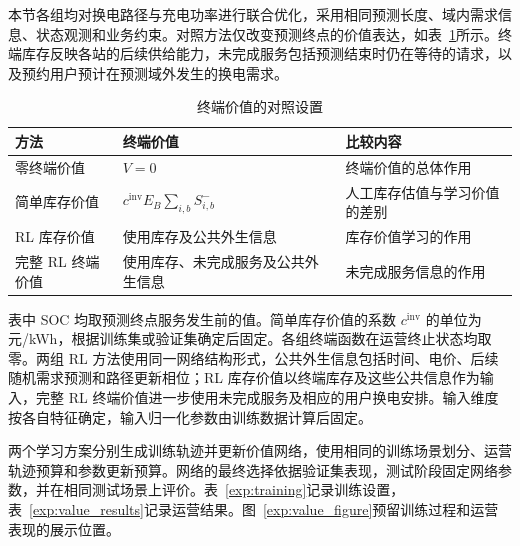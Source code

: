 \documentclass[12pt,a4paper,UTF8]{ctexart}
\numberwithin{equation}{section}
\begin{document}
本节各组均对换电路径与充电功率进行联合优化，采用相同预测长度、域内需求信息、状态观测和业务约束。对照方法仅改变预测终点的价值表达，如表~\ref{exp:value_methods}所示。终端库存反映各站的后续供给能力，未完成服务包括预测结束时仍在等待的请求，以及预约用户预计在预测域外发生的换电需求。

\begin{table}[!htbp]
  \centering
  \caption{终端价值的对照设置}
  \label{exp:value_methods}
  \small
  \begin{tabularx}{\linewidth}{@{}p{2.6cm}XX@{}}
    \toprule
    方法 & 终端价值 & 比较内容 \\
    \midrule
    零终端价值 & $V=0$ & 终端价值的总体作用 \\
    简单库存价值 & $c^{\mathrm{inv}}E_B\sum_{i,b}S_{i,b}^{-}$ & 人工库存估值与学习价值的差别 \\
    RL 库存价值 & 使用库存及公共外生信息 & 库存价值学习的作用 \\
    完整 RL 终端价值 & 使用库存、未完成服务及公共外生信息 & 未完成服务信息的作用 \\
    \bottomrule
  \end{tabularx}
\end{table}

表中 SOC 均取预测终点服务发生前的值。简单库存价值的系数 $c^{\mathrm{inv}}$ 的单位为元/kWh，根据训练集或验证集确定后固定。各组终端函数在运营终止状态均取零。两组 RL 方法使用同一网络结构形式，公共外生信息包括时间、电价、后续随机需求预测和路径更新相位；RL 库存价值以终端库存及这些公共信息作为输入，完整 RL 终端价值进一步使用未完成服务及相应的用户换电安排。输入维度按各自特征确定，输入归一化参数由训练数据计算后固定。

两个学习方案分别生成训练轨迹并更新价值网络，使用相同的训练场景划分、运营轨迹预算和参数更新预算。网络的最终选择依据验证集表现，测试阶段固定网络参数，并在相同测试场景上评价。表~\ref{exp:training}记录训练设置，表~\ref{exp:value_results}记录运营结果。图~\ref{exp:value_figure}预留训练过程和运营表现的展示位置。
\end{document}
